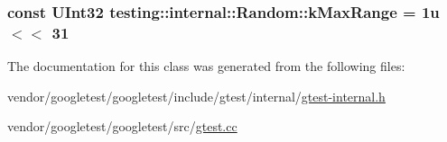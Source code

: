 \subsubsection[{\texorpdfstring{k\+Max\+Range}{kMaxRange}}]{\setlength{\rightskip}{0pt plus 5cm}const {\bf U\+Int32} testing\+::internal\+::\+Random\+::k\+Max\+Range = 1u $<$$<$ 31\hspace{0.3cm}{\ttfamily [static]}}\hypertarget{classtesting_1_1internal_1_1Random_a36d72dd7063d0b5338f229e75382fdd2}{}\label{classtesting_1_1internal_1_1Random_a36d72dd7063d0b5338f229e75382fdd2}


The documentation for this class was generated from the following files\+:\begin{DoxyCompactItemize}
\item 
vendor/googletest/googletest/include/gtest/internal/\hyperlink{gtest-internal_8h}{gtest-\/internal.\+h}\item 
vendor/googletest/googletest/src/\hyperlink{gtest_8cc}{gtest.\+cc}\end{DoxyCompactItemize}
